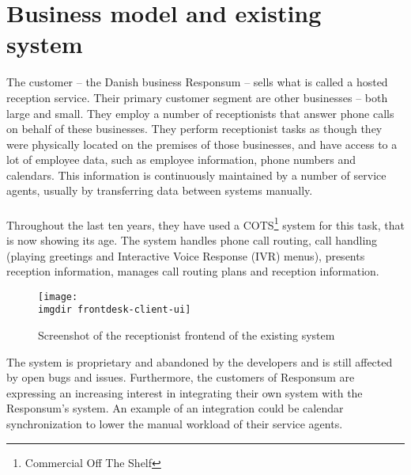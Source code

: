 \section{Business model and existing system}
The customer -- the Danish business Responsum -- sells what is called a hosted reception service. Their primary customer segment are other businesses -- both large and small. They employ a number of receptionists that answer phone calls on behalf of these businesses. They perform receptionist tasks as though they were physically located on the premises of those businesses, and have access to a lot of employee data, such as employee information, phone numbers and calendars. This information is continuously maintained by a number of service agents, usually by transferring data between systems manually.\\\\
Throughout the last ten years, they have used a COTS\footnote{Commercial Off The Shelf} system for this task, that is now showing its age. The system handles phone call routing, call handling (playing greetings and Interactive Voice Response (IVR) menus), presents reception information, manages call routing plans and reception information.
\begin{figure}[!hbpt]
\centering
\texttt{[image: \\imgdir frontdesk-client-ui]}
\caption{Screenshot of the receptionist frontend of the existing system}
\label{fig:frontdesk_screenshot}
\end{figure}
The system is proprietary and abandoned by the developers and is still affected by open bugs and issues. Furthermore, the customers of Responsum are expressing an increasing interest in integrating their own system with the Responsum's system. An example of an integration could be calendar synchronization to lower the manual workload of their service agents.

